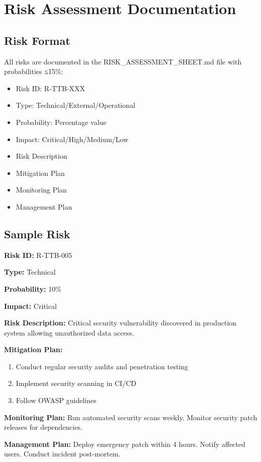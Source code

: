 \chapter{Risk Assessment Documentation}

\section{Risk Format}
All risks are documented in the RISK\_ASSESSMENT\_SHEET.md file with probabilities ≤15\%:
\begin{itemize}[leftmargin=*]
    \item Risk ID: R-TTB-XXX
    \item Type: Technical/External/Operational
    \item Probability: Percentage value
    \item Impact: Critical/High/Medium/Low
    \item Risk Description
    \item Mitigation Plan
    \item Monitoring Plan
    \item Management Plan
\end{itemize}

\section{Sample Risk}
\textbf{Risk ID:} R-TTB-005

\textbf{Type:} Technical

\textbf{Probability:} 10\%

\textbf{Impact:} Critical

\textbf{Risk Description:} Critical security vulnerability discovered in production system allowing unauthorized data access.

\textbf{Mitigation Plan:}
\begin{enumerate}
    \item Conduct regular security audits and penetration testing
    \item Implement security scanning in CI/CD
    \item Follow OWASP guidelines
\end{enumerate}

\textbf{Monitoring Plan:} Run automated security scans weekly. Monitor security patch releases for dependencies.

\textbf{Management Plan:} Deploy emergency patch within 4 hours. Notify affected users. Conduct incident post-mortem.
